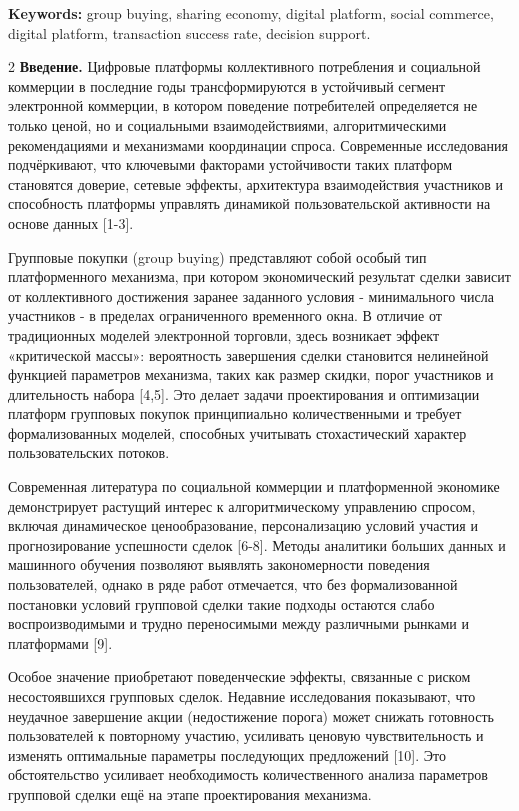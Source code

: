{\bfseries Keywords:} group buying, sharing economy, digital platform,
social commerce, digital platform, trans\-action success rate, decision
support.

\begin{multicols}{2}
{\bfseries Введение.} Цифровые платформы коллективного потребления и
социальной коммерции в последние годы трансформируются в устойчивый
сегмент электронной коммерции, в котором поведение потребителей
определяется не только ценой, но и социальными взаимодействиями,
алгоритмическими рекомендациями и механизмами координации спроса.
Современные исследования подчёркивают, что ключевыми факторами
устойчивости таких платформ становятся доверие, сетевые эффекты,
архитектура взаимодействия участников и способность платформы управлять
динамикой пользовательской активности на основе данных {[}1-3{]}.

Групповые покупки (group buying) представляют собой особый тип
платформенного механизма, при котором экономический результат сделки
зависит от коллективного достижения заранее заданного условия -
минимального числа участников - в пределах ограниченного временного
окна. В отличие от традиционных моделей электронной торговли, здесь
возникает эффект «критической массы»: вероятность завершения сделки
становится нелинейной функцией параметров механизма, таких как размер
скидки, порог участников и длительность набора {[}4,5{]}. Это делает
задачи проектирования и оптимизации платформ групповых покупок
принципиально количественными и требует формализованных моделей,
способных учитывать стохастический характер пользовательских потоков.

Современная литература по социальной коммерции и платформенной экономике
демонстрирует растущий интерес к алгоритмическому управлению спросом,
включая динамическое ценообразование, персонализацию условий участия и
прогнозирование успешности сделок {[}6-8{]}. Методы аналитики больших
данных и машинного обучения позволяют выявлять закономерности поведения
пользователей, однако в ряде работ отмечается, что без формализованной
постановки условий групповой сделки такие подходы остаются слабо
воспроизводимыми и трудно переносимыми между различными рынками и
платформами {[}9{]}.

Особое значение приобретают поведенческие эффекты, связанные с риском
несостоявшихся групповых сделок. Недавние исследования показывают, что
неудачное завершение акции (недостижение порога) может снижать
готовность пользователей к повторному участию, усиливать ценовую
чувствительность и изменять оптимальные параметры последующих
предложений {[}10{]}. Это обстоятельство усиливает необходимость
количественного анализа параметров групповой сделки ещё на этапе
проектирования механизма.


\end{multicols}

